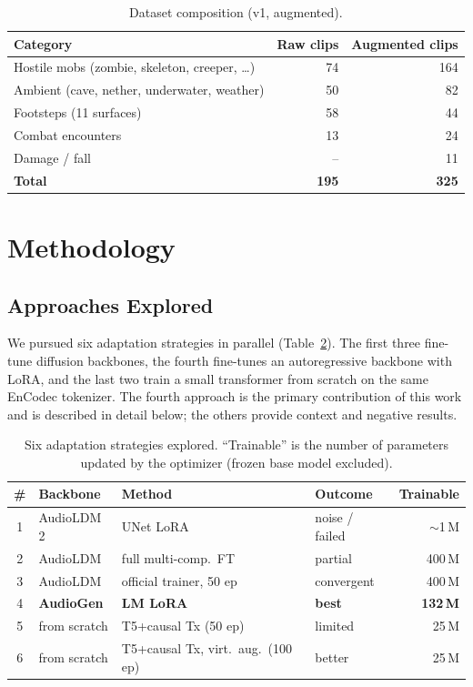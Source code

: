 \documentclass[conference]{IEEEtran}
\begin{document}
\begin{table}[t]
\centering
\caption{Dataset composition (v1, augmented).}
\label{tab:dataset}
\begin{tabular}{lrr}
\toprule
Category & Raw clips & Augmented clips \\
\midrule
Hostile mobs (zombie, skeleton, creeper, \ldots) & 74 & 164 \\
Ambient (cave, nether, underwater, weather)       & 50 &  82 \\
Footsteps (11 surfaces)                           & 58 &  44 \\
Combat encounters                                 & 13 &  24 \\
Damage / fall                                     &  -- & 11 \\
\midrule
\textbf{Total}                                    & \textbf{195} & \textbf{325} \\
\bottomrule
\end{tabular}
\end{table}

\section{Methodology}

\subsection{Approaches Explored}

We pursued six adaptation strategies in parallel
(Table~\ref{tab:approaches}). The first three fine-tune diffusion
backbones, the fourth fine-tunes an autoregressive backbone with LoRA,
and the last two train a small transformer from scratch on the same
EnCodec tokenizer. The fourth approach is the primary contribution of
this work and is described in detail below; the others provide context
and negative results.

\begin{table}[t]
\centering
\caption{Six adaptation strategies explored. ``Trainable'' is the number
of parameters updated by the optimizer (frozen base model excluded).}
\label{tab:approaches}
\setlength{\tabcolsep}{3pt}
\begin{tabular}{clllr}
\toprule
\# & Backbone & Method & Outcome & Trainable \\
\midrule
1 & AudioLDM\,2     & UNet LoRA            & noise / failed     & $\sim$1\,M \\
2 & AudioLDM        & full multi-comp.\ FT & partial            & 400\,M \\
3 & AudioLDM        & official trainer, 50 ep & convergent      & 400\,M \\
4 & \textbf{AudioGen} & \textbf{LM LoRA}   & \textbf{best}      & \textbf{132\,M} \\
5 & from scratch    & T5+causal Tx (50 ep) & limited            &  25\,M \\
6 & from scratch    & T5+causal Tx, virt.\ aug.\ (100 ep) & better &  25\,M \\
\bottomrule
\end{tabular}
\end{table}
\end{document}
